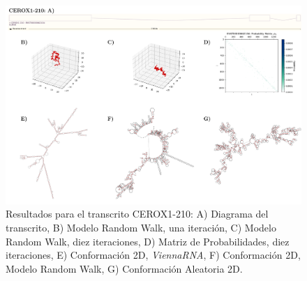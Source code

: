 \documentclass[a4paper,11pt,titlepage]{article}
\theoremstyle{definition}
\begin{document}
\begin{figure}[H]
    \centering
    \includegraphics[width=\textwidth]{images/CEROX1-210_full.png}
    \small{\caption{Resultados para el transcrito CEROX1-210: A) Diagrama del transcrito, B) Modelo Random Walk, una iteración, C) Modelo Random Walk, diez iteraciones, D) Matriz de Probabilidades, diez iteraciones, E) Conformación 2D, \textit{ViennaRNA}, F) Conformación 2D, Modelo Random Walk, G) Conformación Aleatoria 2D.}\label{fig:CEROX1-210-diag}}\normalsize
\end{figure}
\end{document}
